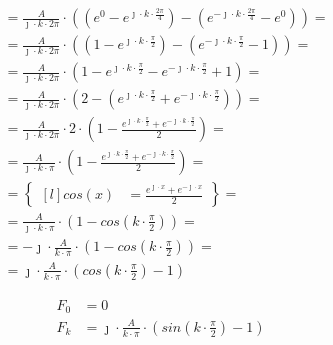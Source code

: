 \begin{task}
\begin{align*}
&=\frac{A}{\jmath \cdot k \cdot 2\pi} \cdot \left(\left( e^{ 0 } - e^{ \jmath \cdot k \cdot \frac{2\pi}{4} } \right)
- \left( e^{ -\jmath \cdot k \cdot \frac{2\pi}{4} } - e^{ 0 }\right) \right)=\\
&=\frac{A}{\jmath \cdot k \cdot 2\pi} \cdot \left(\left( 1 - e^{ \jmath \cdot k \cdot \frac{\pi}{2} } \right)
- \left( e^{-\jmath \cdot k \cdot \frac{\pi}{2} } - 1\right) \right)=\\
&=\frac{A}{\jmath \cdot k \cdot 2\pi} \cdot \left(1 - e^{ \jmath \cdot k \cdot \frac{\pi}{2} } - e^{-\jmath \cdot k \cdot \frac{\pi}{2} } + 1 \right)=\\
&=\frac{A}{\jmath \cdot k \cdot 2\pi} \cdot \left(2 - \left(e^{ \jmath \cdot k \cdot \frac{\pi}{2} } + e^{-\jmath \cdot k \cdot \frac{\pi}{2} } \right) \right)=\\
&=\frac{A}{\jmath \cdot k \cdot 2\pi} \cdot 2 \cdot \left(1 - \frac{e^{ \jmath \cdot k \cdot \frac{\pi}{2} } + e^{-\jmath \cdot k \cdot \frac{\pi}{2} } }{2} \right)=\\
&=\frac{A}{\jmath \cdot k \cdot \pi} \cdot \left(1 - \frac{e^{ \jmath \cdot k \cdot \frac{\pi}{2} } + e^{-\jmath \cdot k \cdot \frac{\pi}{2} } }{2} \right)=\\
&=\begin{Bmatrix*}[l]
cos(x)&=\frac{e^{\jmath \cdot x}+e^{-\jmath \cdot x}}{2}
\end{Bmatrix*}=\\
&=\frac{A}{\jmath \cdot k \cdot \pi} \cdot \left(1 - cos\left( k \cdot \frac{\pi}{2} \right) \right)=\\
&=-\jmath \cdot \frac{A}{k \cdot \pi} \cdot \left(1 - cos\left( k \cdot \frac{\pi}{2} \right) \right)=\\
&=\jmath \cdot \frac{A}{k \cdot \pi} \cdot \left(cos\left( k \cdot \frac{\pi}{2} \right) - 1\right)
\end{align*}



\begin{equation}
\begin{aligned}
F_0&=0\\
F_k&=\jmath \cdot \frac{A}{k \cdot \pi} \cdot \left(sin\left( k \cdot \frac{\pi}{2} \right) - 1\right)\\
\end{aligned}
\end{equation}


\end{task}
